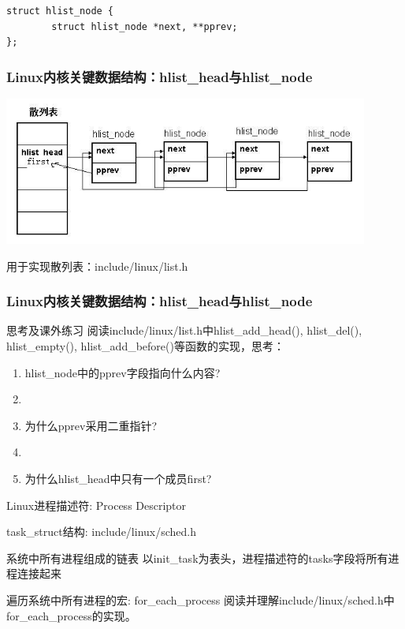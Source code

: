 \documentclass[xcolor=svgnames]{beamer}
\begin{document}
\begin{CJK*}{UTF8}{gbsn}
{\begin{lstlisting}[tabsize=8,basicstyle=\ttfamily]
struct hlist_node {
        struct hlist_node *next, **pprev;
};
\end{lstlisting}
}
\begin{frame}[fragile]
\frametitle{Linux内核关键数据结构：hlist\_head与hlist\_node}
\includegraphics[width=0.9\textwidth]{hlist.jpeg}
\begin{block}{用于实现散列表：include/linux/list.h}
\lsthlist
\end{block}
\end{frame}

\begin{frame}%
\frametitle{Linux内核关键数据结构：hlist\_head与hlist\_node}
\begin{block}{思考及课外练习}
阅读include/linux/list.h中\alert{hlist\_add\_head}(), \alert{hlist\_del}(), \alert{hlist\_empty}(),
\alert{hlist\_add\_before}()等函数的实现，思考：

\begin{enumerate}
\item hlist\_node中的pprev字段指向什么内容?
\item[]
\item 为什么pprev采用二重指针?
\item[]
\item 为什么hlist\_head中只有一个成员first?
\end{enumerate}
\end{block}
\end{frame}

\begin{frame}{Linux进程描述符: Process Descriptor}
\begin{block}{task\_struct结构: include/linux/sched.h}
\lsttasks
\end{block}
\begin{block}{系统中所有进程组成的链表}
以init\_task为表头，进程描述符的tasks字段将所有进程连接起来
\end{block}
\begin{block}{遍历系统中所有进程的宏: for\_each\_process}
阅读并理解include/linux/sched.h中for\_each\_process的实现。
\end{block}
\end{frame}


\end{CJK*}
\end{document}

